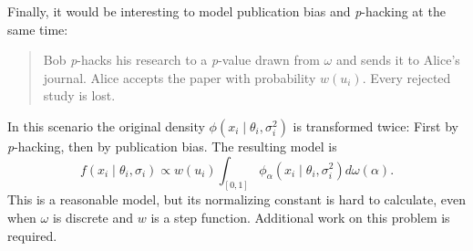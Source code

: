 \documentclass[useAMS,usenatbib,referee]{biom}
\begin{document}
Finally, it would be interesting to model publication bias and \textit{p}-hacking at the same time:
\begin{quote}
Bob \textit{p}-hacks his research to a \textit{p}-value drawn from $\omega$ and sends it to Alice's journal. Alice accepts the paper with probability $w(u_i)$. Every rejected study is lost.
\end{quote}
In this scenario the original density $\phi(x_{i}\mid\theta_{i},\sigma^2_{i})$ is transformed twice: First by \textit{p}-hacking, then by publication bias. The resulting model is
$$
f(x_{i}\mid\theta_{i},\sigma_{i})\propto w(u_i)\int_{[0,1]}\phi_{\alpha}(x_{i}\mid\theta_{i},\sigma^2_{i})d\omega(\alpha).
$$
This is a reasonable model, but its normalizing constant is hard to calculate, even when $\omega$ is discrete and $w$ is a step function. Additional work on this problem is required.




\label{lastpage}
\end{document}
